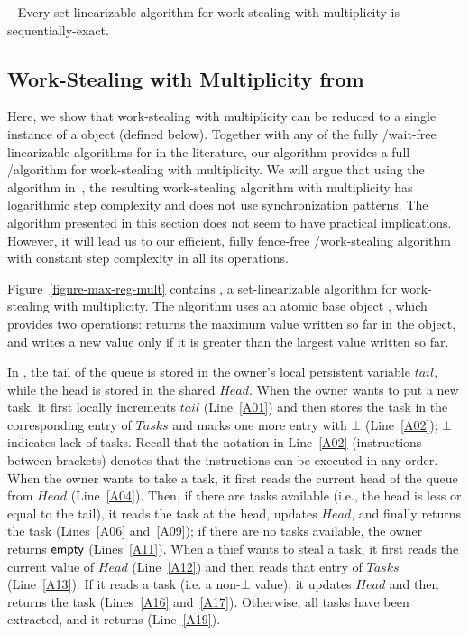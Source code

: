 \begin{remark}~\label{remark-seq-exact-set-lin}
Every set-linearizable algorithm for work-stealing with multiplicity is sequentially-exact.
\end{remark}

\subsection{\label{sec-ws-mult-max-reg}Work-Stealing with Multiplicity from \MaxReg}


Here, we show that work-stealing with multiplicity can be reduced to a single instance of a \MaxReg object (defined below).  Together with any of the fully \R/\W wait-free linearizable algorithms for \MaxReg in the literature, our algorithm provides a full \R/\W algorithm for work-stealing with multiplicity.  We will argue that using the \MaxReg algorithm in~\cite{DBLP_journals_jacm_AspnesAC12}, the resulting work-stealing algorithm with multiplicity has logarithmic step complexity and does not use \RAW synchronization patterns. The algorithm presented in this section does not seem to have practical implications. However, it will lead us to our efficient, fully fence-free \R/\W work-stealing algorithm with constant step complexity in all its operations.

Figure~\ref{figure-max-reg-mult} contains \WFWSM, a set-linearizable algorithm for work-stealing with multiplicity. The algorithm uses an atomic base object \MaxReg, which provides two operations: \MaxR returns the maximum value written so far in the object, and \MaxW writes a new value only if it is greater than the largest value written so far.


In \WFWSM, the tail of the queue is stored in the owner's local persistent variable \(tail\), while the head is stored in the shared \MaxReg \(Head\).  When the owner wants to put a new task, it first locally increments \(tail\) (Line~\ref{A01}) and then stores the task in the corresponding entry of \(Tasks\) and marks one more entry with \(\bot\) (Line~\ref{A02}); \(\bot\) indicates lack of tasks.  Recall that the notation in Line~\ref{A02} (instructions between brackets) denotes that the instructions can be executed in any order.  When the owner wants to take a task, it first reads the current head of the queue from \(Head\) (Line~\ref{A04}). Then, if there are tasks available (i.e., the head is less or equal to the tail), it reads the task at the head, updates \(Head\), and finally returns the task (Lines~\ref{A06} and~\ref{A09}); if there are no tasks available, the owner returns ${\sf \small empty}$ (Lines~\ref{A11}).  When a thief wants to steal a task, it first reads the current value of \(Head\) (Line~\ref{A12}) and then reads that entry of \(Tasks\) (Line~\ref{A13}).  If it reads a task (i.e. a non-\(\bot\) value), it updates \(Head\) and then returns the task (Lines~\ref{A16} and~\ref{A17}).  Otherwise, all tasks have been extracted, and it returns \epty (Line~\ref{A19}).

